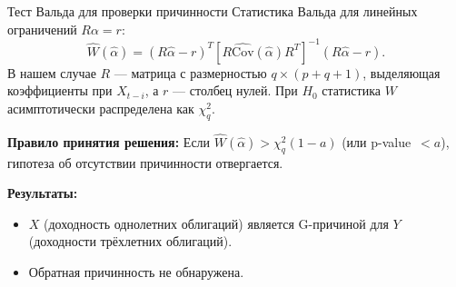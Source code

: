 \documentclass{beamer}
\begin{document}
	\begin{frame}{Тест Вальда для проверки причинности}
		Статистика Вальда для линейных ограничений $R \alpha = r$:
		\begin{equation*}
			\widehat{W}(\widehat\alpha) = (R \widehat\alpha - r)^T \left[ R \widehat{\text{Cov}}(\widehat\alpha) R^T \right]^{-1} (R \widehat\alpha - r).
		\end{equation*}
		В нашем случае $R$ --- матрица с размерностью $q \times (p+q+1)$, выделяющая коэффициенты при $X_{t-i}$, а $r$ --- столбец нулей. При $H_0$ статистика $W$ асимптотически распределена как $\chi^2_q$.
		
		\vspace{0.3cm}
		\textbf{Правило принятия решения:}
		Если $\widehat{W}(\widehat\alpha) > \chi^2_q(1-a)$ (или p-value~$< a$), гипотеза об отсутствии причинности отвергается.
		
		\textbf{Результаты:}
		\begin{itemize}
			\item $X$ (доходность однолетних облигаций) является G-причиной для $Y$ (доходности трёхлетних облигаций).
			\item Обратная причинность не обнаружена.
		\end{itemize}
	\end{frame}
	
	
\end{document}
